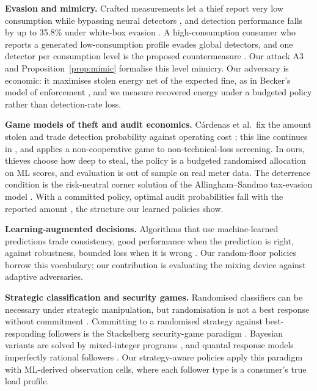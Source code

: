 \documentclass[journal]{IEEEtran}
\begin{document}
\textbf{Evasion and mimicry.} Crafted measurements let a thief report very low consumption while bypassing neural detectors \cite{li2020sff}, and detection performance falls by up to 35.8\% under white-box evasion \cite{takiddin2023}. A high-consumption consumer who reports a generated low-consumption profile evades global detectors, and one detector per consumption level is the proposed countermeasure \cite{badr2023}. Our attack A3 and Proposition~\ref{prop:mimic} formalise this level mimicry. Our adversary is economic: it maximises stolen energy net of the expected fine, as in Becker's model of enforcement \cite{becker1968}, and we measure recovered energy under a budgeted policy rather than detection-rate loss.

\textbf{Game models of theft and audit economics.} Cárdenas et al.\ fix the amount stolen and trade detection probability against operating cost \cite{cardenas2012}; this line continues in \cite{amin2015}, and \cite{lin2014} applies a non-cooperative game to non-technical-loss screening. In ours, thieves choose how deep to steal, the policy is a budgeted randomised allocation on ML scores, and evaluation is out of sample on real meter data. The deterrence condition is the risk-neutral corner solution of the Allingham--Sandmo tax-evasion model \cite{allingham1972}. With a committed policy, optimal audit probabilities fall with the reported amount \cite{reinganum1985,border1987}, the structure our learned policies show.

\textbf{Learning-augmented decisions.} Algorithms that use machine-learned predictions trade consistency, good performance when the prediction is right, against robustness, bounded loss when it is wrong \cite{lykouris2021,purohit2018}. Our random-floor policies borrow this vocabulary; our contribution is evaluating the mixing device against adaptive adversaries.

\textbf{Strategic classification and security games.} Randomised classifiers can be necessary under strategic manipulation, but randomisation is not a best response without commitment \cite{braverman2020}. Committing to a randomised strategy against best-responding followers is the Stackelberg security-game paradigm \cite{conitzer2006,tambe2011}. Bayesian variants are solved by mixed-integer programs \cite{paruchuri2008}, and quantal response models imperfectly rational followers \cite{mckelvey1995}. Our strategy-aware policies apply this paradigm with ML-derived observation cells, where each follower type is a consumer's true load profile.
\end{document}
